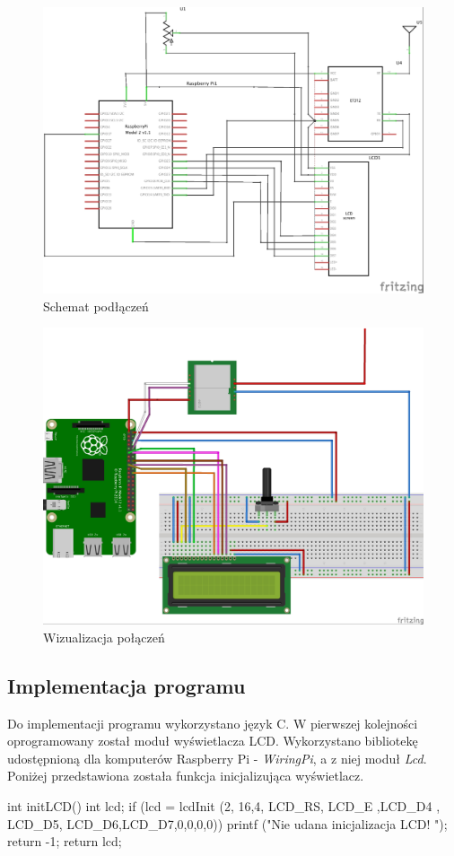 \documentclass{article}
\begin{document}
			\begin{figure}[H]
				\centering
				\includegraphics[width=0.9\linewidth]{schemat-podlaczenia_schem.jpg}
				\caption{Schemat podłączeń}
			\end{figure}
			
			
			\begin{figure}[H]
				\centering
				\includegraphics[width=0.9\linewidth]{schemat-podlaczenia_bb.jpg}
				\caption{Wizualizacja połączeń}
			\end{figure}
			
	\subsection{Implementacja programu}
		Do implementacji programu wykorzystano język C. W pierwszej kolejności oprogramowany został moduł wyświetlacza LCD. Wykorzystano bibliotekę udostępnioną dla komputerów Raspberry Pi - \textit{WiringPi}, a z niej moduł \textit{Lcd}. Poniżej przedstawiona została funkcja inicjalizująca wyświetlacz.
		\begin{verbatimtab}[4]
	int initLCD(){
		int lcd;
		if (lcd = lcdInit (2, 16,4, LCD_RS, LCD_E ,LCD_D4 , LCD_D5, LCD_D6,LCD_D7,0,0,0,0)){
			printf ("Nie udana inicjalizacja LCD! \n");
			return -1;
		}
		return lcd;
	}
		\end{verbatimtab}
		
\end{document}
